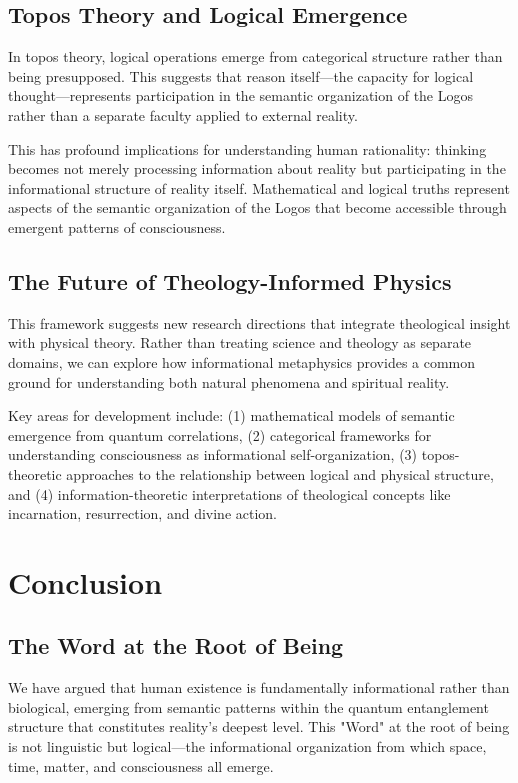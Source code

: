 \documentclass[12pt]{article}
\begin{document}
\subsection{Topos Theory and Logical Emergence}

In topos theory, logical operations emerge from categorical structure rather than being presupposed. This suggests that reason itself—the capacity for logical thought—represents participation in the semantic organization of the Logos rather than a separate faculty applied to external reality.

This has profound implications for understanding human rationality: thinking becomes not merely processing information about reality but participating in the informational structure of reality itself. Mathematical and logical truths represent aspects of the semantic organization of the Logos that become accessible through emergent patterns of consciousness.

\subsection{The Future of Theology-Informed Physics}

This framework suggests new research directions that integrate theological insight with physical theory. Rather than treating science and theology as separate domains, we can explore how informational metaphysics provides a common ground for understanding both natural phenomena and spiritual reality.

Key areas for development include: (1) mathematical models of semantic emergence from quantum correlations, (2) categorical frameworks for understanding consciousness as informational self-organization, (3) topos-theoretic approaches to the relationship between logical and physical structure, and (4) information-theoretic interpretations of theological concepts like incarnation, resurrection, and divine action.

\section{Conclusion}

\subsection{The Word at the Root of Being}

We have argued that human existence is fundamentally informational rather than biological, emerging from semantic patterns within the quantum entanglement structure that constitutes reality's deepest level. This "Word" at the root of being is not linguistic but logical—the informational organization from which space, time, matter, and consciousness all emerge.
\end{document}
